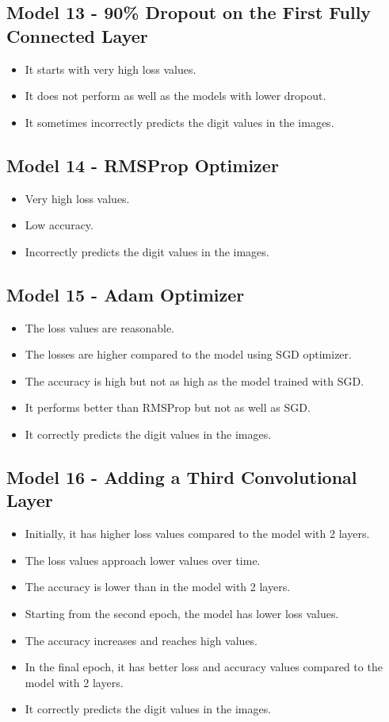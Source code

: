 \documentclass{article}
\begin{document}
\subsection*{Model 13 - 90\% Dropout on the First Fully Connected Layer}
\begin{itemize}
  \item It starts with very high loss values.
  \item It does not perform as well as the models with lower dropout.
  \item It sometimes incorrectly predicts the digit values in the images.
\end{itemize}

\subsection*{Model 14 - RMSProp Optimizer}
\begin{itemize}
  \item Very high loss values.
  \item Low accuracy.
  \item Incorrectly predicts the digit values in the images.
\end{itemize}

\subsection*{Model 15 - Adam Optimizer}
\begin{itemize}
  \item The loss values are reasonable.
  \item The losses are higher compared to the model using SGD optimizer.
  \item The accuracy is high but not as high as the model trained with SGD.
  \item It performs better than RMSProp but not as well as SGD.
  \item It correctly predicts the digit values in the images.
\end{itemize}

\subsection*{Model 16 - Adding a Third Convolutional Layer}
\begin{itemize}
  \item Initially, it has higher loss values compared to the model with 2 layers.
  \item The loss values approach lower values over time.
  \item The accuracy is lower than in the model with 2 layers.
  \item Starting from the second epoch, the model has lower loss values.
  \item The accuracy increases and reaches high values.
  \item In the final epoch, it has better loss and accuracy values compared to the model with 2 layers.
  \item It correctly predicts the digit values in the images.
\end{itemize}
\end{document}
